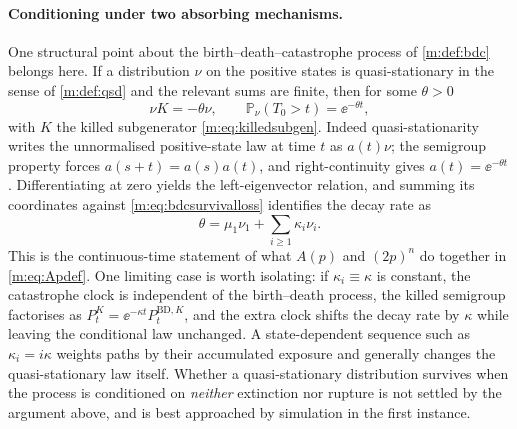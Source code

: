 \paragraph{Conditioning under two absorbing mechanisms.}
One structural point about the birth--death--catastrophe process of
\cref{m:def:bdc} belongs here. If a distribution $\nu$ on the positive states is
quasi-stationary in the sense of \cref{m:def:qsd} and the relevant sums are finite,
then for some $\theta>0$
\begin{equation}
\label{m:eq:bdcqsdeigen}
\nu K = -\theta\nu,
\qquad
\mathbb{P}_\nu\!\left(T_0>t\right) = \ee^{-\theta t},
\end{equation}
with $K$ the killed subgenerator \cref{m:eq:killedsubgen}. Indeed
quasi-stationarity writes the unnormalised positive-state law at time $t$ as
$a(t)\nu$; the semigroup property forces $a(s+t)=a(s)a(t)$, and right-continuity
gives $a(t)=\ee^{-\theta t}$. Differentiating at zero yields the left-eigenvector
relation, and summing its coordinates against \cref{m:eq:bdcsurvivalloss}
identifies the decay rate as
\begin{equation}
\label{m:eq:bdcdecayrate}
\theta = \mu_1\nu_1 + \sum_{i\ge1}\kappa_i\nu_i .
\end{equation}
This is the continuous-time statement of what $A(p)$ and $(2p)^n$ do together in
\cref{m:eq:Apdef}. One limiting case is worth
isolating: if $\kappa_i\equiv\kappa$ is constant, the catastrophe clock is
independent of the birth--death process, the killed semigroup factorises as
$P^K_t = \ee^{-\kappa t}P^{\mathrm{BD},K}_t$, and the extra clock shifts the decay
rate by $\kappa$ while leaving the conditional law unchanged. A state-dependent
sequence such as $\kappa_i=i\kappa$ weights paths by their accumulated exposure and
generally changes the quasi-stationary law itself. Whether a quasi-stationary
distribution survives when the process is conditioned on \emph{neither} extinction
nor rupture is not settled by the argument above, and is best approached by
simulation in the first instance.

%
